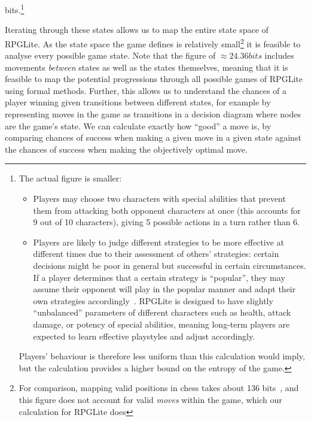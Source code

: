 bits\).\footnote{
  The actual figure is smaller: 
  \begin{itemize}
    \item Players may choose two characters with special abilities that prevent
    them from attacking both opponent characters at once (this accounts for 9
    out of 10 characters), giving 5 possible actions in a turn rather than 6.
    \item Players are likely to judge different strategies to be more effective
    at different times due to their assessment of others' strategies: certain
    decisions might be poor in general but successful in certain circumstances.
    If a player determines that a certain strategy is ``popular'', they may
    assume their opponent will play in the popular manner and adapt their own
    strategies
    accordingly~\cite{howard1971metagames_seminal,metagaming_in_esports}.
    RPGLite is designed to have slightly ``unbalanced'' parameters of different
    characters such as health, attack damage, or potency of special abilities,
    meaning long-term players are expected to learn effective playstyles and
    adjust accordingly.
\end{itemize}\par{}\indent{}
Players' behaviour
is therefore less uniform than this calculation would imply, but the calculation
provides a higher bound on the entropy of the game.
}

Iterating through these states allows us to map the entire state space of
RPGLite. As the state space the game defines is relatively small\footnote{For
comparison, mapping valid positions in chess takes about 136
bits~\cite{information_content_chess}, and this figure does not account for
valid \emph{moves} within the game, which our calculation for RPGLite does} 
it is feasible to analyse every possible game state. Note that the figure of
\(\approx 24.36 bits\) includes movements \emph{between} states as well as the
states themselves, meaning that it is feasible to map the potential progressions
through all possible games of RPGLite using formal methods. Further, this allows
us to understand the chances of a player winning given transitions between
different states, for example by representing moves in the game as transitions
in a decision diagram where nodes are the game's state. We can calculate exactly
how ``good'' a move is, by comparing chances of success when making a given move in a
given state against the chances of success when making the objectively optimal
move.

